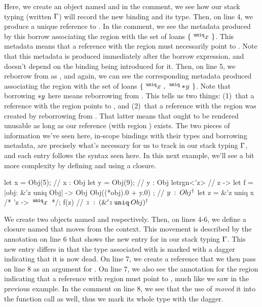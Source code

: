 Here, we create an object named  and in the comment, we see how our
stack typing (written $\Gamma$) will record the new binding and its type.
Then, on line 4, we produce a unique reference to . In the comment, we
see the metadata produced by this borrow associating the region  with
the set of loans $\{ \: \,^{\mathtt{uniq}}x\, \: \}$. This metadata means that a
reference with the region  must necessarily point to . Note
that this metadata is produced immediately after the borrow expression, and
doesn't depend on the binding  being introduced for it. Then, on line
5, we reborrow from  as , and again, we can see the
corresponding metadata produced associating the region  with the set
of loans
$\{ \:  \,^{\mathtt{uniq}}x\, \, , \: \,^{\mathtt{uniq}}* \! y\,  \: \}$.
Note that borrowing $* y$ here means reborrowing from . This
tells us two things: (1)~that a reference with the region  points to
, and (2)~that a reference with the region  was created by
reborrowing from . That latter means that  ought to be
rendered unusable as long as our reference  (with region )
exists. The two pieces of information we've seen here, in-scope bindings with
their types and borrowing metadata, are precisely what's necessary for us to
track in our stack typing $\Gamma$, and each entry follows the syntax seen
here. In this next example, we'll see a bit more complexity by defining and
using a closure.

\begin{rustbk}
  let x = Obj(5); // x : Obj
  let y = Obj(9); // y : Obj
  letrgn<'z> { // z -> {}
    let f = |obj: &'z uniq Obj| -> Obj { Obj((*obj).0 + y.0) }; // $y \: : \: Obj^\dagger$
    let z = &'z uniq x /* 'z -> { $\,^{\mathtt{uniq}}x\,$ } */;
    f(z) // $z \: : \: (\& 'z \: \mathtt{uniq} \: Obj)^\dagger$
  }
\end{rustbk}

We create two objects named  and  respectively. Then, on lines
4-6, we define a closure named  that moves  from the context.
This movement is described by the annotation on line 6 that shows the new entry
for  in our stack typing $\Gamma$. This new entry differs in that
the type associated with  is marked with a dagger indicating that it is
now dead. On line 7, we create a reference  that we then pass on line 8
as an argument for . On line 7, we also see the annotation for the
region indicating that a reference with region  must point to
, much like we saw in the previous example. In the comment on line 8,
we see that the use of  \emph{moved} it into the function call as well,
thus we mark its whole type with the dagger.

